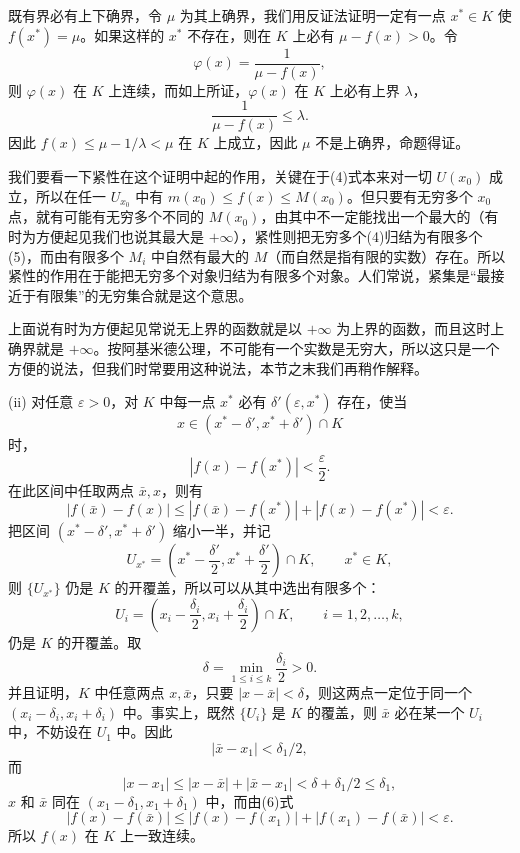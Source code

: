 既有界必有上下确界，令 $\mu$ 为其上确界，我们用反证法证明一定有一点 $x^*\in K$ 使 $f(x^*)=\mu$。如果这样的 $x^*$ 不存在，则在 $K$ 上必有 $\mu-f(x)>0$。令
\[
 \varphi(x)=\frac1{\mu-f(x)},
\]
则 $\varphi(x)$ 在 $K$ 上连续，而如上所证，$\varphi(x)$ 在 $K$ 上必有上界 $\lambda$，
\[
 \frac1{\mu-f(x)}\le\lambda.
\]
因此 $f(x)\le\mu-1/\lambda<\mu$ 在 $K$ 上成立，因此 $\mu$ 不是上确界，命题得证。

我们要看一下紧性在这个证明中起的作用，关键在于(4)式本来对一切 $U(x_0)$ 成立，所以在任一 $U_{x_0}$ 中有 $m(x_0)\le f(x)\le M(x_0)$。但只要有无穷多个 $x_0$ 点，就有可能有无穷多个不同的 $M(x_0)$，由其中不一定能找出一个最大的（有时为方便起见我们也说其最大是 $+\infty$），紧性则把无穷多个(4)归结为有限多个(5)，而由有限多个 $M_i$ 中自然有最大的 $M$（而自然是指有限的实数）存在。所以紧性的作用在于能把无穷多个对象归结为有限多个对象。人们常说，紧集是“最接近于有限集”的无穷集合就是这个意思。

上面说有时为方便起见常说无上界的函数就是以 $+\infty$ 为上界的函数，而且这时上确界就是 $+\infty$。按阿基米德公理，不可能有一个实数是无穷大，所以这只是一个方便的说法，但我们时常要用这种说法，本节之末我们再稍作解释。

(ii) 对任意 $\varepsilon>0$，对 $K$ 中每一点 $x^*$ 必有 $\delta'(\varepsilon,x^*)$ 存在，使当
\[
 x\in(x^*-\delta',x^*+\delta')\cap K
\]
时，
\[
 |f(x)-f(x^*)|<\frac\varepsilon2.
\]
在此区间中任取两点 $\bar x,x$，则有
\begin{equation}
 |f(\bar x)-f(x)|\le|f(\bar x)-f(x^*)|+|f(x)-f(x^*)|<\varepsilon.
 \tag{6}
\end{equation}
把区间 $(x^*-\delta',x^*+\delta')$ 缩小一半，并记
\[
 U_{x^*}=\left(x^*-\frac{\delta'}2,x^*+\frac{\delta'}2\right)\cap K,
 \qquad x^*\in K,
\]
则 $\{U_{x^*}\}$ 仍是 $K$ 的开覆盖，所以可以从其中选出有限多个：
\[
 U_i=\left(x_i-\frac{\delta_i}2,x_i+\frac{\delta_i}2\right)\cap K,
 \qquad i=1,2,\ldots,k,
\]
仍是 $K$ 的开覆盖。取
\[
 \delta=\min_{1\le i\le k}\frac{\delta_i}{2}>0.
\]
并且证明，$K$ 中任意两点 $x,\bar x$，只要 $|x-\bar x|<\delta$，则这两点一定位于同一个 $(x_i-\delta_i,x_i+\delta_i)$ 中。事实上，既然 $\{U_i\}$ 是 $K$ 的覆盖，则 $\bar x$ 必在某一个 $U_i$ 中，不妨设在 $U_1$ 中。因此
\[
 |\bar x-x_1|<\delta_1/2,
\]
而
\[
 |x-x_1|\le|x-\bar x|+|\bar x-x_1|<\delta+\delta_1/2\le\delta_1,
\]
$x$ 和 $\bar x$ 同在 $(x_1-\delta_1,x_1+\delta_1)$ 中，而由(6)式
\[
 |f(x)-f(\bar x)|\le|f(x)-f(x_1)|+|f(x_1)-f(\bar x)|<\varepsilon.
\]
所以 $f(x)$ 在 $K$ 上一致连续。

